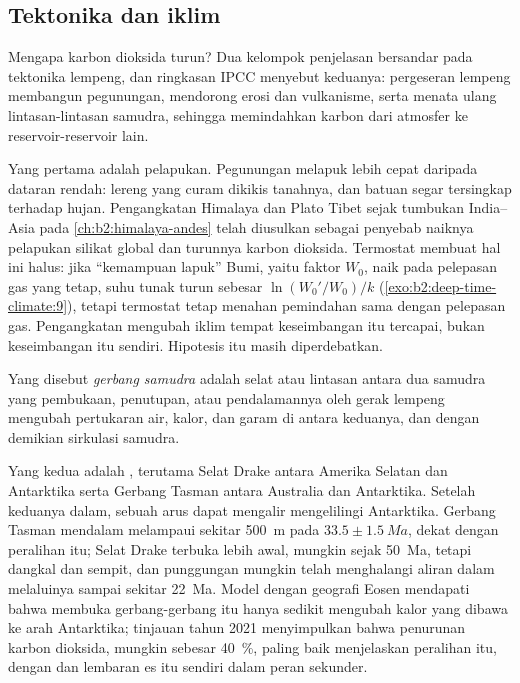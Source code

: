 \subsection*{Tektonika dan iklim}

Mengapa karbon dioksida turun? Dua kelompok penjelasan bersandar pada tektonika lempeng, dan ringkasan
IPCC menyebut keduanya: pergeseran lempeng membangun pegunungan, mendorong erosi dan vulkanisme, serta
menata ulang lintasan-lintasan samudra, sehingga memindahkan karbon dari atmosfer ke reservoir-reservoir lain.

Yang pertama adalah pelapukan. Pegunungan melapuk lebih cepat daripada dataran rendah: lereng yang curam dikikis
tanahnya, dan batuan segar tersingkap terhadap hujan. Pengangkatan Himalaya dan Plato Tibet sejak
tumbukan India--Asia pada \cref{ch:b2:himalaya-andes} telah diusulkan sebagai penyebab naiknya pelapukan
silikat global dan turunnya karbon dioksida. Termostat membuat hal ini halus: jika
``kemampuan lapuk'' Bumi, yaitu faktor $W_0$, naik pada pelepasan gas yang tetap, suhu tunak
turun sebesar $\ln(W_0'/W_0)/k$ (\cref{exo:b2:deep-time-climate:9}), tetapi termostat tetap menahan
pemindahan sama dengan pelepasan gas. Pengangkatan mengubah iklim tempat keseimbangan itu tercapai, bukan
keseimbangan itu sendiri. Hipotesis itu masih diperdebatkan.

\begin{definition}\label{def:b2:deep-time-climate:gateway}
Yang disebut \emph{gerbang samudra} adalah selat atau lintasan antara dua samudra yang pembukaan,
penutupan, atau pendalamannya oleh gerak lempeng mengubah pertukaran air, kalor, dan garam di antara keduanya, dan
dengan demikian sirkulasi samudra.
\end{definition}

Yang kedua adalah , terutama Selat Drake antara Amerika Selatan dan Antarktika
serta Gerbang Tasman antara Australia dan Antarktika. Setelah keduanya dalam, sebuah arus dapat mengalir
mengelilingi Antarktika. Gerbang Tasman mendalam melampaui sekitar \qty{500}{m} pada $33.5 \pm
\qty{1.5}{Ma}$, dekat dengan peralihan itu; Selat Drake terbuka lebih awal, mungkin sejak \qty{50}{Ma},
tetapi dangkal dan sempit, dan punggungan mungkin telah menghalangi aliran dalam melaluinya sampai sekitar \qty{22}{Ma}. Model dengan
geografi Eosen mendapati bahwa membuka gerbang-gerbang itu hanya sedikit mengubah kalor yang dibawa ke arah
Antarktika; tinjauan tahun 2021 menyimpulkan bahwa penurunan karbon dioksida, mungkin sebesar
\qty{40}{\percent}, paling baik menjelaskan peralihan itu, dengan  dan lembaran es itu sendiri dalam
peran sekunder.

